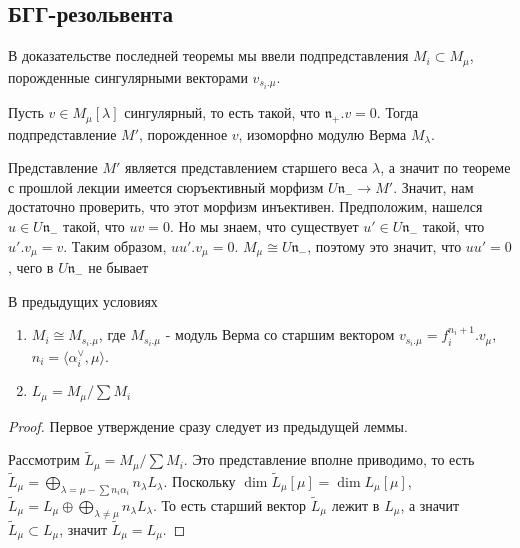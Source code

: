 \documentclass[a4article]{article}
\begin{document}
\subsection*{БГГ-резольвента}
В доказательстве последней теоремы мы ввели подпредставления $M_i \subset M_{\mu}$, порожденные сингулярными векторами $v_{s_i.\mu}$. 
\begin{lemma}
    Пусть $v \in M_{\mu}[\lambda]$ сингулярный, то есть такой, что $\mathfrak{n}_+.v=0$. Тогда подпредставление $M'$, порожденное $v$, изоморфно модулю Верма $M_{\lambda}$.
\end{lemma}
Представление $M'$ является представлением старшего веса $\lambda$, а значит по теореме с прошлой лекции имеется сюръективный морфизм $U\mathfrak{n}_ -\rightarrow M'$. Значит, нам достаточно проверить, что этот морфизм инъективен. Предположим, нашелся $u \in U\mathfrak{n}_-$ такой, что $uv=0$. Но мы знаем, что существует $u'\in U\mathfrak{n}_-$ такой, что $u'.v_{\mu}=v$. Таким образом, $uu'.v_{\mu}=0$. $M_\mu \cong U\mathfrak{n}_-$, поэтому это значит, что $uu'=0$, чего в $U\mathfrak{n}_-$ не бывает
\begin{theorem}
В предыдущих условиях
    \begin{enumerate}
        \item $M_i \cong M_{s_i.\mu}$, где $M_{s_i.\mu}$ - модуль Верма со старшим вектором $v_{s_i.\mu}=f_i^{n_i+1}.v_{\mu}$, $n_i = \langle\alpha_i^{\vee}, \mu \rangle$.
        \item $L_{\mu} = M_{\mu}/\sum M_i$
    \end{enumerate}
\end{theorem}
\begin{proof}
    Первое утверждение сразу следует из предыдущей леммы. 

    Рассмотрим $\tilde{L}_{\mu}=M_{\mu}/\sum M_i$. Это представление вполне приводимо, то есть $\tilde{L}_{\mu} = \bigoplus_{\lambda = \mu - \sum n_i\alpha_i} n_{\lambda}L_{\lambda}$. Поскольку $\dim\tilde{L}_{\mu}[\mu] = \dim L_{\mu}[\mu]$, $\tilde{L}_{\mu} = L_{\mu}\oplus \bigoplus_{\lambda \ne \mu} n_{\lambda}L_{\lambda}$. То есть старший вектор $\tilde{L}_{\mu}$ лежит в $L_{\mu}$, а значит $\tilde{L}_{\mu} \subset L_{\mu}$, значит $\tilde{L}_{\mu} = L_{\mu}$. 
\end{proof}
\end{document}
